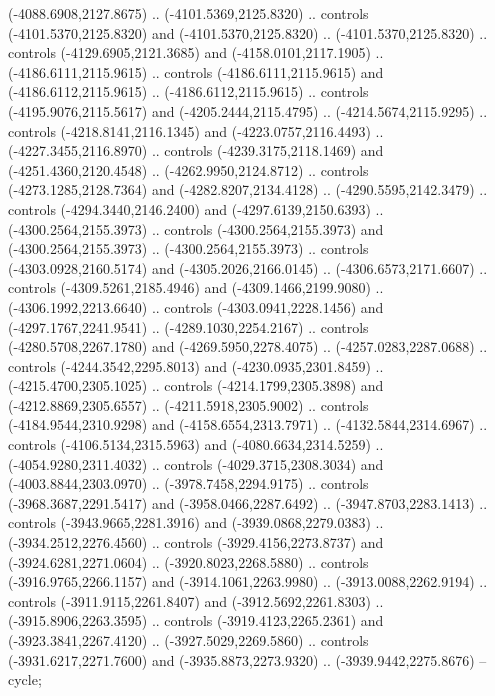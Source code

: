 \begin{scope}[shift={(430.80877,-416.69739)}]
\begin{scope}[shift={(4537.8125,-1856.4436)}]
\begin{scope}[shift={(-148.39113,-28.14259)}]
        (-4088.6908,2127.8675) .. (-4101.5369,2125.8320) .. controls
        (-4101.5370,2125.8320) and (-4101.5370,2125.8320) .. (-4101.5370,2125.8320) ..
        controls (-4129.6905,2121.3685) and (-4158.0101,2117.1905) ..
        (-4186.6111,2115.9615) .. controls (-4186.6111,2115.9615) and
        (-4186.6112,2115.9615) .. (-4186.6112,2115.9615) .. controls
        (-4195.9076,2115.5617) and (-4205.2444,2115.4795) .. (-4214.5674,2115.9295) ..
        controls (-4218.8141,2116.1345) and (-4223.0757,2116.4493) ..
        (-4227.3455,2116.8970) .. controls (-4239.3175,2118.1469) and
        (-4251.4360,2120.4548) .. (-4262.9950,2124.8712) .. controls
        (-4273.1285,2128.7364) and (-4282.8207,2134.4128) .. (-4290.5595,2142.3479) ..
        controls (-4294.3440,2146.2400) and (-4297.6139,2150.6393) ..
        (-4300.2564,2155.3973) .. controls (-4300.2564,2155.3973) and
        (-4300.2564,2155.3973) .. (-4300.2564,2155.3973) .. controls
        (-4303.0928,2160.5174) and (-4305.2026,2166.0145) .. (-4306.6573,2171.6607) ..
        controls (-4309.5261,2185.4946) and (-4309.1466,2199.9080) ..
        (-4306.1992,2213.6640) .. controls (-4303.0941,2228.1456) and
        (-4297.1767,2241.9541) .. (-4289.1030,2254.2167) .. controls
        (-4280.5708,2267.1780) and (-4269.5950,2278.4075) .. (-4257.0283,2287.0688) ..
        controls (-4244.3542,2295.8013) and (-4230.0935,2301.8459) ..
        (-4215.4700,2305.1025) .. controls (-4214.1799,2305.3898) and
        (-4212.8869,2305.6557) .. (-4211.5918,2305.9002) .. controls
        (-4184.9544,2310.9298) and (-4158.6554,2313.7971) .. (-4132.5844,2314.6967) ..
        controls (-4106.5134,2315.5963) and (-4080.6634,2314.5259) ..
        (-4054.9280,2311.4032) .. controls (-4029.3715,2308.3034) and
        (-4003.8844,2303.0970) .. (-3978.7458,2294.9175) .. controls
        (-3968.3687,2291.5417) and (-3958.0466,2287.6492) .. (-3947.8703,2283.1413) ..
        controls (-3943.9665,2281.3916) and (-3939.0868,2279.0383) ..
        (-3934.2512,2276.4560) .. controls (-3929.4156,2273.8737) and
        (-3924.6281,2271.0604) .. (-3920.8023,2268.5880) .. controls
        (-3916.9765,2266.1157) and (-3914.1061,2263.9980) .. (-3913.0088,2262.9194) ..
        controls (-3911.9115,2261.8407) and (-3912.5692,2261.8303) ..
        (-3915.8906,2263.3595) .. controls (-3919.4123,2265.2361) and
        (-3923.3841,2267.4120) .. (-3927.5029,2269.5860) .. controls
        (-3931.6217,2271.7600) and (-3935.8873,2273.9320) .. (-3939.9442,2275.8676) --
        cycle;


\end{scope}
\end{scope}
\end{scope}
